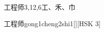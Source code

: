 \begin{entry}{工程师}{3,12,6}{⼯、⽲、⼱}
  \begin{phonetics}{工程师}{gong1cheng2shi1}[][HSK 3]
  \end{phonetics}
\end{entry}
